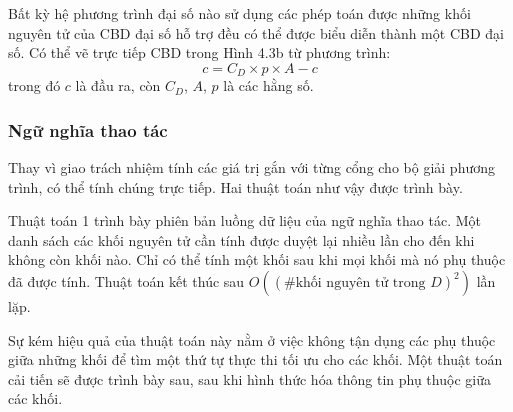 Bất kỳ hệ phương trình đại số nào sử dụng các phép toán được những khối nguyên tử của CBD đại số hỗ trợ đều có thể được biểu diễn thành một CBD đại số. Có thể vẽ trực tiếp CBD trong Hình 4.3b từ phương trình:
\begin{equation}c=C_D\times p\times A-c\tag{4.6}\end{equation}
trong đó $c$ là đầu ra, còn $C_D$, $A$, $p$ là các hằng số.

\subsubsection{Ngữ nghĩa thao tác}
Thay vì giao trách nhiệm tính các giá trị gắn với từng cổng cho bộ giải phương trình, có thể tính chúng trực tiếp. Hai thuật toán như vậy được trình bày.

Thuật toán 1 trình bày phiên bản luồng dữ liệu của ngữ nghĩa thao tác. Một danh sách các khối nguyên tử cần tính được duyệt lại nhiều lần cho đến khi không còn khối nào. Chỉ có thể tính một khối sau khi mọi khối mà nó phụ thuộc đã được tính. Thuật toán kết thúc sau $O((\#\text{khối nguyên tử trong }D)^2)$ lần lặp.

Sự kém hiệu quả của thuật toán này nằm ở việc không tận dụng các phụ thuộc giữa những khối để tìm một thứ tự thực thi tối ưu cho các khối. Một thuật toán cải tiến sẽ được trình bày sau, sau khi hình thức hóa thông tin phụ thuộc giữa các khối.

\newcommand{\chfourline}[2]{\noindent\hspace*{#1em}#2\par}
